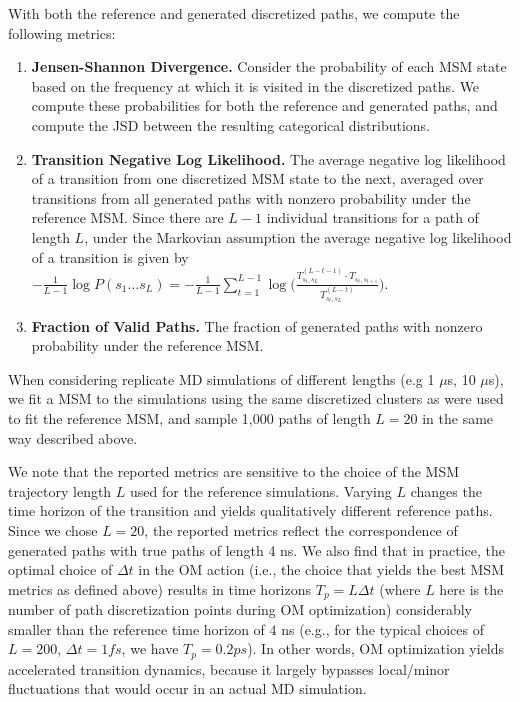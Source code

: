 With both the reference and generated discretized paths, we compute the following metrics:
\begin{enumerate}
    \item \textbf{Jensen-Shannon Divergence.} Consider the probability of each MSM state based on the frequency at which it is visited in the discretized paths. We compute these probabilities for both the reference and generated paths, and compute the JSD between the resulting categorical distributions.
    \item \textbf{Transition Negative Log Likelihood.} The average negative log likelihood of a transition from one discretized MSM state to the next, averaged over transitions from all generated paths with nonzero probability under the reference MSM. Since there are $L-1$ individual transitions for a path of length $L$, under the Markovian assumption the average negative log likelihood of a transition is given by $-\frac{1}{L-1}\log P(s_1 \ldots s_L) = -\frac{1}{L-1}\sum_{t=1}^{L-1} \log \Bigg( \frac{T^{(L-t-1)}_{s_t, s_L} \cdot T_{s_t, s_{t+1}}}{T^{(L-t)}_{s_t, s_L}} \Bigg)$.
    \item \textbf{Fraction of Valid Paths.} The fraction of generated paths with nonzero probability under the reference MSM.
\end{enumerate}


When considering replicate MD simulations of different lengths (e.g 1 $\mu$s, 10 $\mu$s), we fit a MSM to the simulations using the same discretized clusters as were used to fit the reference MSM, and sample 1,000 paths of length $L=20$ in the same way described above. 

We note that the reported metrics are sensitive to the choice of the MSM trajectory length $L$ used for the reference simulations. Varying $L$ changes the time horizon of the transition and yields qualitatively different reference paths. Since we chose $L=20$, the reported metrics reflect the correspondence of generated paths with true paths of length 4 ns. We also find that in practice, the optimal choice of $\Delta t$ in the OM action (i.e., the choice that yields the best MSM metrics as defined above) results in time horizons $T_p = L \Delta t$ (where $L$ here is the number of path discretization points during OM optimization) considerably smaller than the reference time horizon of $4$ ns (e.g., for the typical choices of $L = 200$, $\Delta t= 1 fs$, we have $T_p = 0.2 ps$). In other words, OM optimization yields accelerated transition dynamics, because it largely bypasses local/minor fluctuations that would occur in an actual MD simulation. 

